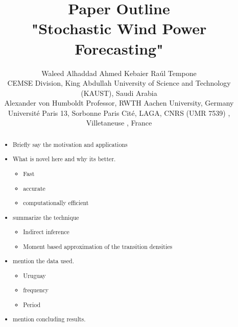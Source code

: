 \documentclass[10pt,twocolumn,letterpaper]{article}
\begin{document}
\title{Paper Outline  \\ "Stochastic Wind Power Forecasting"  }  %

\author{ Waleed Alhaddad\textsuperscript{\textasteriskcentered} \qquad Ahmed Kebaier\textsuperscript{\ddag} \qquad Ra\'ul  Tempone\textsuperscript{\textasteriskcentered}\textsuperscript{\textdagger} \\
\textsuperscript{\textasteriskcentered}CEMSE Division, King Abdullah University of Science and Technology (KAUST), Saudi Arabia \\ \textsuperscript{\textdagger}Alexander von Humboldt Professor, RWTH Aachen University,  Germany
 \\ \textsuperscript{\ddag}Université Paris 13, Sorbonne Paris Cité, LAGA, CNRS (UMR 7539) , Villetaneuse , France }

\maketitle


\begin{abstract}

\begin{itemize}
    \item Briefly say the motivation and applications
    \item What is novel here and why its better.
    \begin{itemize}
        \item Fast
        \item accurate
        \item computationally efficient
    \end{itemize}
    \item summarize the technique
    \begin{itemize}
        \item Indirect inference
        \item Moment based approximation of the transition densities
    \end{itemize}
    \item mention the data used.
    \begin{itemize}
        \item Uruguay
        \item frequency
        \item Period
    \end{itemize}
    \item mention concluding results.
\end{itemize}

\end{abstract}
\end{document}
